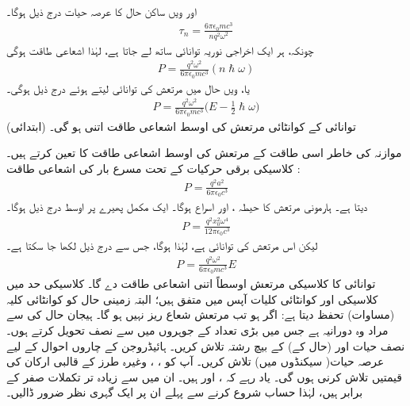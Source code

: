 اور ویں ساکن حال کا عرصہ حیات درج ذیل ہوگا۔
\begin{align}
	\tau_n = \frac{6\pi\epsilon_0mc^3}{nq^2\omega^2}
\end{align}
چونکہ، ہر ایک اخراجی نوریہ  توانائی ساتھ لے جاتا ہے، لہٰذا اشعاعی طاقت  ہوگی
\begin{align*}
	P = \frac{q^2\omega^2}{6\pi\epsilon_0mc^3}(n\hslash\omega)
\end{align*}
یا، ویں حال میں مرتعش کی توانائی  لیتے ہوئے درج ذیل ہوگی۔
\begin{align}\label{مساوات_تابع_مضطرب_زمینی_توانائی_رہے_گی}
	P = \frac{q^2\omega^2}{6\pi\epsilon_0mc^3}\big(E-\frac{1}{2}\hslash\omega\big)
\end{align}
(ابتدائی) توانائی  کے کوانٹائی مرتعش کی اوسط اشعاعی طاقت اتنی ہو گی۔

موازنہ کی خاطر اسی طاقت کے  مرتعش کی اوسط اشعاعی طاقت کا تعین کرتے ہیں۔ کلاسیکی برقی حرکیات کے تحت مسرع بار  کی اشعاعی طاقت :
\begin{align}
	P = \frac{q^2a^2}{6\pi\epsilon_0c^3}
\end{align}
 دیتا ہے۔ ہارمونی مرتعش  کا حیطہ ، اور اسراع  ہوگا۔ ایک مکمل پھیرے پر اوسط درج ذیل ہوگا۔
\begin{align*}
	P = \frac{q^2x^2_0\omega^4}{12\pi\epsilon_0c^3}
\end{align*}
لیکن اس مرتعش کی توانائی  ہے، لہٰذا  ہوگا، جس سے درج ذیل لکھا جا سکتا ہے۔
\begin{align}
	P = \frac{q^2\omega^2}{6\pi\epsilon_0mc^3}E
\end{align}
توانائی  کا کلاسیکی مرتعش اوسطاً اتنی اشعاعی طاقت دے گا۔ کلاسیکی حد  میں کلاسیکی اور کوانٹائی کلیات آپس میں متفق ہیں؛ البتہ زمینی حال کو کوانٹائی کلیہ
 (مساوات) تحفظ دیتا ہے: اگر  ہو تب مرتعش شعاع ریز نہیں ہو گا۔
ہیجان حال کی   سے مراد وہ دورانیہ ہے جس میں بڑی تعداد کے جوہروں میں سے نصف تحویل کرتے ہوں۔ نصف حیات  اور (حال کے)   کے بیچ رشتہ تلاش کریں۔
ہائیڈروجن کے چاروں  احوال کے لیے عرصہ حیات( سیکنڈوں میں) تلاش کریں۔  آپ کو ، ، وغیرہ طرز کے قالبی ارکان کی قیمتیں تلاش کرنی ہوں گی۔ یاد رہے کہ
 ،  اور  ہیں۔ ان میں سے زیادہ تر تکملات صفر کے برابر ہیں، لہٰذا حساب شروع کرنے سے پہلے ان پر ایک گہری نظر ضرور ڈالیں۔

